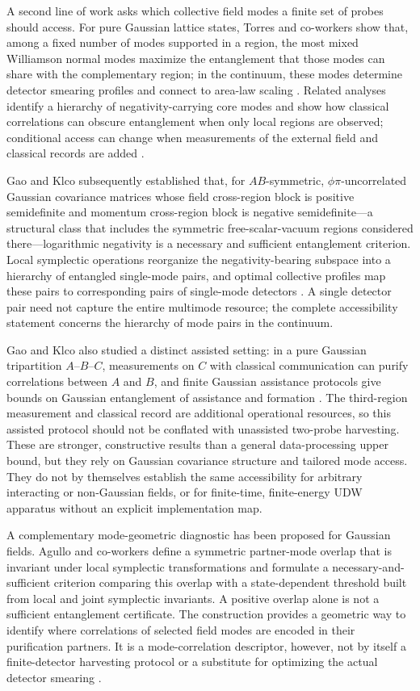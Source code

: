 \documentclass[pdflatex,sn-mathphys-num]{sn-jnl}
\begin{document}
A second line of work asks which collective field modes a finite set of probes should access. For pure Gaussian lattice states, Torres and co-workers show that, among a fixed number of modes supported in a region, the most mixed Williamson normal modes maximize the entanglement that those modes can share with the complementary region; in the continuum, these modes determine detector smearing profiles and connect to area-law scaling \cite{Torres2023}. Related analyses identify a hierarchy of negativity-carrying core modes and show how classical correlations can obscure entanglement when only local regions are observed; conditional access can change when measurements of the external field and classical records are added \cite{KlcoBeckSavage2023,KlcoBeck2023}.

Gao and Klco subsequently established that, for $AB$-symmetric, $\phi\pi$-uncorrelated Gaussian covariance matrices whose field cross-region block is positive semidefinite and momentum cross-region block is negative semidefinite---a structural class that includes the symmetric free-scalar-vacuum regions considered there---logarithmic negativity is a necessary and sufficient entanglement criterion. Local symplectic operations reorganize the negativity-bearing subspace into a hierarchy of entangled single-mode pairs, and optimal collective profiles map these pairs to corresponding pairs of single-mode detectors \cite{GaoKlco2025}. A single detector pair need not capture the entire multimode resource; the complete accessibility statement concerns the hierarchy of mode pairs in the continuum.

Gao and Klco also studied a distinct assisted setting: in a pure Gaussian tripartition $A$--$B$--$C$, measurements on $C$ with classical communication can purify correlations between $A$ and $B$, and finite Gaussian assistance protocols give bounds on Gaussian entanglement of assistance and formation \cite{GaoKlco2026Assistance}. The third-region measurement and classical record are additional operational resources, so this assisted protocol should not be conflated with unassisted two-probe harvesting. These are stronger, constructive results than a general data-processing upper bound, but they rely on Gaussian covariance structure and tailored mode access. They do not by themselves establish the same accessibility for arbitrary interacting or non-Gaussian fields, or for finite-time, finite-energy UDW apparatus without an explicit implementation map.

A complementary mode-geometric diagnostic has been proposed for Gaussian fields. Agullo and co-workers define a symmetric partner-mode overlap that is invariant under local symplectic transformations and formulate a necessary-and-sufficient criterion comparing this overlap with a state-dependent threshold built from local and joint symplectic invariants. A positive overlap alone is not a sufficient entanglement certificate. The construction provides a geometric way to identify where correlations of selected field modes are encoded in their purification partners. It is a mode-correlation descriptor, however, not by itself a finite-detector harvesting protocol or a substitute for optimizing the actual detector smearing \cite{AgulloPartner2025}.
\end{document}
